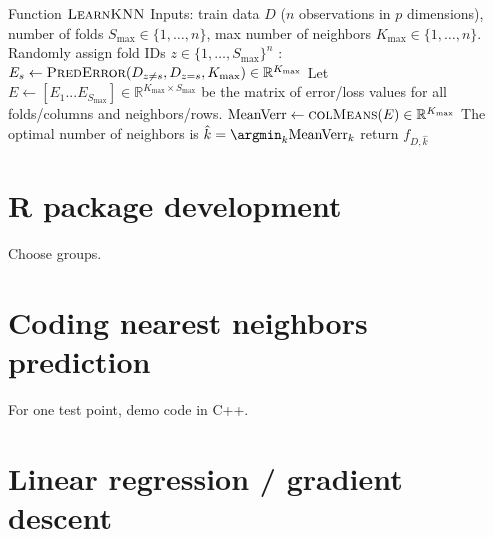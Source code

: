 \documentclass{article}
\begin{document}
\begin{algorithmic}[1]
  \State Function $\textsc{LearnKNN}$
  \State Inputs: train data $D$ ($n$ observations in $p$ dimensions), 
  number of folds $S_{\text{max}}\in\{1,\dots, n\}$, 
  max number of neighbors $K_{\text{max}}\in\{1, \dots, n\}$.
  \State Randomly assign fold IDs $z\in\{1,\dots,S_{\text{max}}\}^n$
  :
  \State $E_s\gets \textsc{PredError}(D_{z\neq s}, D_{z=s}, K_{\text{max}})\in\mathbb R^{K_{\text{max}}}$
  \EndFor
  Let
  $E\gets[E_1 ... E_{S_{\text{max}}}]\in\mathbb R^{K_{\text{max}}\times
    S_{\text{max}}}$ be the matrix of error/loss values for all
  folds/columns and neighbors/rows.
  \State $\text{MeanVerr}\gets \textsc{colMeans}(E)\in\mathbb R^{K_{\text{max}}}$
  \State The optimal number of neighbors is $\hat k = \argmin_k \text{MeanVerr}_k$
  \State return $f_{D,\hat k}$
\end{algorithmic}

\section{R package development}

Choose groups.

\section{Coding nearest neighbors prediction}

For one test point, demo code in C++.

\section{Linear regression / gradient descent}
\end{document}
